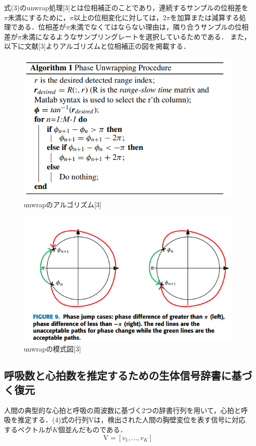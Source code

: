 \documentclass[dvipdfmx]{jsarticle}
\begin{document}
式(3)のunwrap処理[3]とは位相補正のことであり，連続するサンプルの位相差を$\pi$未満にするために，$\pi$以上の位相変化に対しては，2$\pi$を加算または減算する処理である．位相差が$\pi$未満でなくてはならない理由は，隣り合うサンプルの位相差が$\pi$未満になるようなサンプリングレートを選択しているためである．
また，以下に文献[3]よりアルゴリズムと位相補正の図を掲載する．
\begin{figure}[H]
\begin{center}
\includegraphics[width=0.8\linewidth]{./img/unwrap_2.png}
\end{center}
\caption{unwrapのアルゴリズム[3]}
\end{figure}

\begin{figure}[H]
\begin{center}
\includegraphics[width=0.8\linewidth]{./img/unwrap_1.png}
\end{center}
\caption{unwrapの模式図[3]}
\end{figure}

\subsection{呼吸数と心拍数を推定するための生体信号辞書に基づく復元}
人間の典型的な心拍と呼吸の周波数に基づく2つの辞書行列を用いて，心拍と呼吸を推定する．(4)式の行列$\mathrm{V}$は，検出された人間の胸壁変位を表す信号に対応するベクトルが$K$個並んだものである．
\begin{equation}\label{}
\mathrm{V} = [v_1, ..., v_K]
\end{equation}
\end{document}
